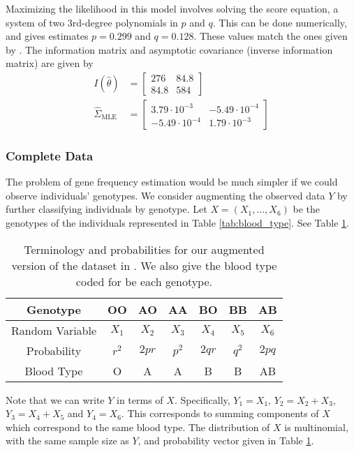 \documentclass[11pt, oneside]{article}   	%
\begin{document}
Maximizing the likelihood in this model involves solving the score equation, a system of two 3rd-degree polynomials in $p$ and $q$. This can be done numerically, and gives estimates $p = 0.299$ and $q = 0.128$. These values match the ones given by \citet{Fuj78}. The information matrix and asymptotic covariance (inverse information matrix) are given by
%
\begin{align}
    I(\hat{\theta}) &= \begin{bmatrix}
        276 & 84.8\\
        84.8 & 584
    \end{bmatrix}\\
    \hat{\Sigma}_\mathrm{MLE} &= \begin{bmatrix}
        3.79 \cdot 10^{-3} & -5.49 \cdot 10^{-4}\\
        -5.49 \cdot 10^{-4} & 1.79 \cdot 10^{-3}
    \end{bmatrix}
\end{align}

\subsubsection{Complete Data}

The problem of gene frequency estimation would be much simpler if we could observe individuals' genotypes. We consider augmenting the observed data $Y$ by further classifying individuals by genotype. Let $X = (X_1, \ldots, X_6)$ be the genotypes of the individuals represented in Table \ref{tab:blood_type}. See Table \ref{tab:blood_type_complete}.

\begin{table}
    \centering
    \caption{Terminology and probabilities for our augmented version of the dataset in \citet{Fuj78}. We also give the blood type coded for be each genotype.}
    \begin{tabular}{c|cccccc}
        Genotype & OO & AO & AA & BO & BB & AB\\
        \hline
        Random Variable & $X_1$ & $X_2$ & $X_3$ & $X_4$ & $X_5$ & $X_6$\\
        Probability & $r^2$ & $2pr$ & $p^2$ & $2qr$ & $q^2$ & $2pq$\\
        Blood Type & O & A & A & B & B & AB
    \end{tabular}
    
    \label{tab:blood_type_complete}
\end{table}

Note that we can write $Y$ in terms of $X$. Specifically, $Y_1 = X_1$, $Y_2 = X_2 + X_3$, $Y_3 = X_4 + X_5$ and $Y_4 = X_6$. This corresponds to summing components of $X$ which correspond to the same blood type. The distribution of $X$ is multinomial, with the same sample size as $Y$, and probability vector given in Table \ref{tab:blood_type_complete}.
\end{document}
